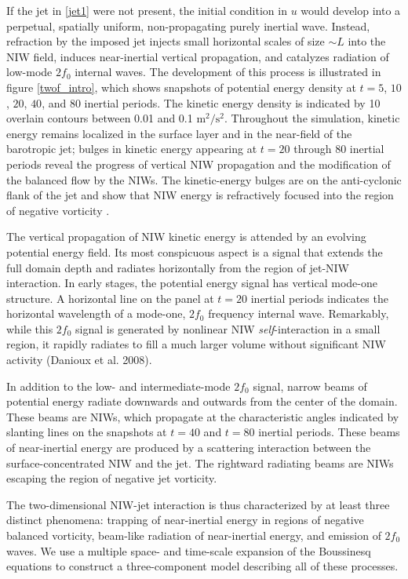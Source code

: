 \documentclass[12pt, oneside]{book}
\begin{document}
If the jet in \eqref{jet1} were not present, the initial condition in $u$ would develop into a perpetual, spatially uniform, non-propagating purely inertial wave.   Instead, refraction by the  imposed jet injects small horizontal scales of size $\sim \! \! L$ into the NIW field, induces near-inertial vertical propagation, and catalyzes radiation of low-mode $2f_0$ internal waves.  The development of this process is illustrated in figure \ref{twof_intro}, which shows snapshots of potential energy density at $t=5$, $10$, $20$, $40$, and $80$ inertial periods.  The kinetic energy density is indicated  by  10 overlain contours between 0.01 and 0.1 $\mathrm{m^2/s^2}$.  Throughout the simulation, kinetic energy remains localized in the surface layer and in the near-field of the barotropic jet; bulges in kinetic energy appearing at $t=20$ through $80$ inertial periods  reveal the progress of vertical NIW propagation and the modification of the balanced flow by the NIWs.  The kinetic-energy bulges are on the anti-cyclonic flank of the jet and show that NIW energy is refractively focused into the region of negative vorticity \citep{balmforth,LeeNiiler}. 

The vertical propagation of NIW kinetic energy is attended by an evolving potential energy field.  Its most conspicuous aspect is a signal that extends the full domain depth and radiates horizontally from the region of jet-NIW interaction.  In early stages, the potential energy signal has vertical mode-one structure.  A horizontal line on the panel at $t=20$ inertial periods indicates the horizontal wavelength of a mode-one, $2f_0$ frequency internal wave.  Remarkably, while this $2 f_0$ signal is generated by nonlinear NIW {\it self}-interaction in a small region, it rapidly radiates to fill a much larger volume without significant NIW activity (Danioux et al. 2008).

In addition to the low- and intermediate-mode $2f_0$ signal, narrow beams of potential energy radiate downwards and outwards from the center of the domain.  These beams are NIWs, which propagate at the characteristic angles indicated by slanting lines on the snapshots at $t=40$ and $t=80$ inertial periods.  These beams of near-inertial energy are produced by a scattering interaction between the surface-concentrated NIW and the jet.  The rightward radiating beams are NIWs escaping the region of negative jet vorticity. 

The two-dimensional NIW-jet interaction is thus characterized by at least three distinct phenomena: trapping of near-inertial energy in regions of negative balanced vorticity, beam-like radiation of near-inertial energy, and emission of $2f_0$ waves.  We use a multiple space- and time-scale expansion of the Boussinesq equations to construct a three-component model describing all of these processes.
\end{document}
